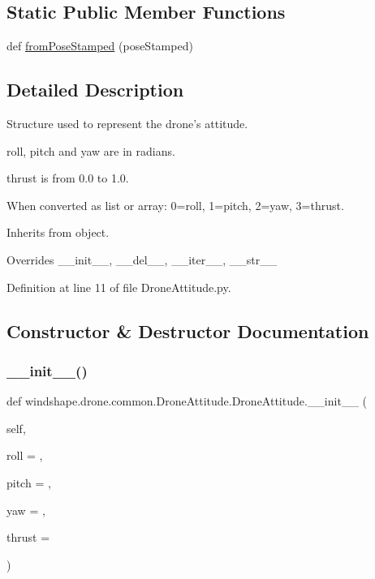 \subsection*{Static Public Member Functions}
\begin{DoxyCompactItemize}
\item 
def \mbox{\hyperlink{classwindshape_1_1drone_1_1common_1_1_drone_attitude_1_1_drone_attitude_a1935bec5ebbfbd088ad61a78b987ee41}{from\+Pose\+Stamped}} (pose\+Stamped)
\end{DoxyCompactItemize}


\subsection{Detailed Description}
\begin{DoxyVerb}Structure used to represent the drone's attitude.

roll, pitch and yaw are in radians.

thrust is from 0.0 to 1.0.

When converted as list or array: 0=roll, 1=pitch, 2=yaw, 3=thrust.

Inherits from object.
    
Overrides __init__, __del__, __iter__, __str__
\end{DoxyVerb}
 

Definition at line 11 of file Drone\+Attitude.\+py.



\subsection{Constructor \& Destructor Documentation}
\mbox{\label{classwindshape_1_1drone_1_1common_1_1_drone_attitude_1_1_drone_attitude_a3e991775a6809f6507e42dd571e42575}} 
\subsubsection{\texorpdfstring{\+\_\+\+\_\+init\+\_\+\+\_\+()}{\_\_init\_\_()}}
{\footnotesize\ttfamily def windshape.\+drone.\+common.\+Drone\+Attitude.\+Drone\+Attitude.\+\_\+\+\_\+init\+\_\+\+\_\+ (\begin{DoxyParamCaption}\item[{}]{self,  }\item[{}]{roll = {},  }\item[{}]{pitch = {},  }\item[{}]{yaw = {},  }\item[{}]{thrust = {} }\end{DoxyParamCaption})}

